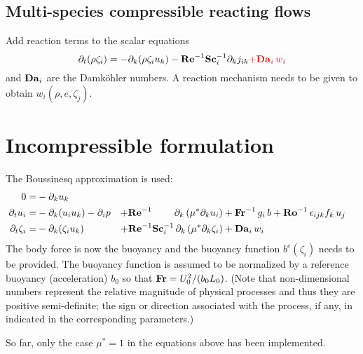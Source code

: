 \subsection{Multi-species compressible reacting flows}

Add reaction terms to the scalar equations
\begin{equation}
  \partial_t (\rho \zeta_i)= -\partial_k (\rho \zeta_i u_k)
  - \mathrm{\bf Re}^{-1}\mathrm{\bf Sc}_i^{-1} \partial_k j_{ik} \color{red}{+\mathrm{\bf Da}_i\,w_i}
\end{equation}
and $\mathrm{\bf Da}_i$ are the Damk{\"o}hler numbers. A reaction mechanism needs to be given to obtain $w_i(\rho,e,\zeta_j)$.

\section{Incompressible formulation}

The Boussinesq approximation is used:
\begin{subequations}
  \begin{align}
    0                   =& -\partial_k u_k                                          \\
    \partial_t  u_i     =& -\partial_k ( u_i u_k )-\partial_i p                     &
    +\mathrm{\bf Re}^{-1}\qquad\;\partial_k \left( \mu^{*} \partial_k u_i\right)  &
    +\mathrm{\bf Fr}^{-1}\, g_i\,b +\mathrm{\bf Ro}^{-1}\,\epsilon_{ijk} f_k\,u_j  \\
    \partial_t \zeta_i  =& -\partial_k (\zeta_i u_k)                                &
    +\mathrm{\bf Re}^{-1}\mathrm{\bf Sc}_i^{-1}\, \partial_k \left( \mu^{*}\partial_k\zeta_i\right) &+ \mathrm{\bf Da}_i\,w_i
  \end{align}
\end{subequations}
The body force is now the buoyancy and the buoyancy function $b^e(\zeta_i)$ needs to be provided. The buoyancy function is assumed to be normalized by a reference buoyancy (acceleration) $b_0$ so that $\mathrm{\bf Fr}=U_0^2/(b_0L_0)$. (Note that non-dimensional numbers represent the relative magnitude of physical processes and thus they are positive semi-definite; the sign or direction associated with the process, if any, in indicated in the corresponding parameters.)

So far, only the case $\mu^*=1$ in the equations above has been implemented.

